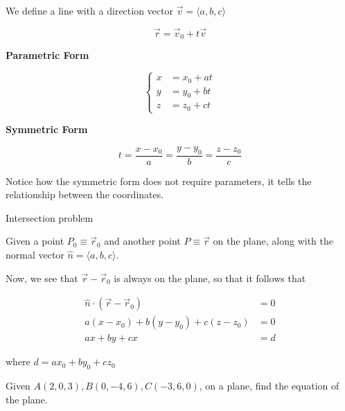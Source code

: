 \begin{definition}[Line]
	We define a line with a direction vector $\vec v = \langle a, b, c \rangle$

	\begin{equation}
		\vec r = \vec v_0 + t \vec v
	\end{equation}

	\textbf{Parametric Form}

	\begin{equation}
		\begin{cases}
			x &= x_0 + at\\
			y &= y_0 + bt\\
			z &= z_0 + ct
		\end{cases}
	\end{equation}

	\textbf{Symmetric Form}

	\begin{equation}
		t = \frac{x - x_0}{a} = \frac{y - y_0}{b} = \frac{z - z_0}{c}
	\end{equation}

	Notice how the symmetric form does not require parameters, it tells the relationship between the coordinates.
\end{definition}

\begin{example}
	Intersection problem
\end{example}

\begin{definition}[Plane]
	Given a point $P_0 \equiv \vec r_0$ and another point $P \equiv \vec r$ on the plane, along with the normal vector $\hat n = \langle a, b, c \rangle$.

	Now, we see that $\vec r - \vec r_0$ is always on the plane, so that it follows that

	\begin{align}
		\hat n \cdot (\vec r - \vec r_0) &= 0\\
		a(x - x_0) + b(y - y_0) + c(z - z_0) &= 0\\
		ax + by + cx &= d
	\end{align}

	where $d = ax_0 + by_0 + cz_0$
\end{definition}

\begin{example}
	Given $A(2, 0, 3), B(0, -4, 6), C(-3, 6, 0)$,  on a plane, find the equation of the plane.
\end{example}

